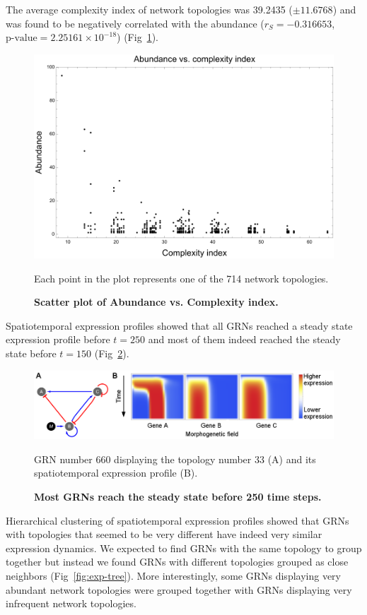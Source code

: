 \documentclass[10pt,letterpaper]{article}
\begin{document}
The average complexity index of network topologies was 39.2435 ($\pm 11.6768$)
and was found to be negatively correlated with the abundance ($r_S = -0.316653$,
$\text{p-value} = 2.25161\times10^{-18}$) (Fig~\ref{fig:ab-comp}).

\begin{figure}[!h]
 \includegraphics[width=\textwidth]{figures/results/abundance-vs-complexity-index}
 \caption{\bf Scatter plot of Abundance vs. Complexity index.}
 Each point in the plot represents one of the 714 network topologies.
 \label{fig:ab-comp}
\end{figure}

Spatiotemporal expression profiles showed that all GRNs reached a steady state
expression profile before $t = 250$ and most of them indeed reached the steady
state before $t = 150$ (Fig~\ref{fig:profile}).

\begin{figure}[!h]
 \includegraphics[width=\textwidth]{figures/results/GRN_660_topol_33_spatio-temp_exp_profile}
 \caption{\bf Most GRNs reach the steady state before 250 time steps.}
 GRN number 660 displaying the topology number 33 (A) and its spatiotemporal
 expression profile (B).
 \label{fig:profile}
\end{figure}

Hierarchical clustering of spatiotemporal expression profiles showed that GRNs
with topologies that seemed to be very different have indeed very similar
expression dynamics. We expected to find GRNs with the same topology to group
together but instead we found GRNs with different topologies grouped as close
neighbors (Fig~\ref{fig:exp-tree}). More interestingly, some GRNs displaying 
very abundant network topologies were grouped together with GRNs displaying 
very infrequent network topologies.
\end{document}
